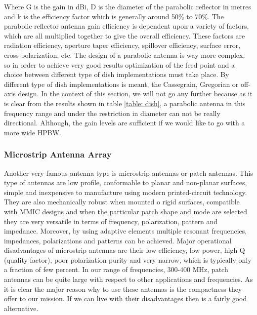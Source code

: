 \noindent
Where G is the gain in dBi, D is the diameter of the parabolic reflector in metres and k is the efficiency factor which is generally around 50\% to 70\%. The parabolic reflector antenna gain efficiency is dependent upon a variety of factors, which are all multiplied together to give the overall efficiency. These factors are radiation efficiency, aperture taper efficiency, spillover efficiency, surface error, cross polarization, etc. The design of a parabolic antenna is way more complex, so in order to achieve very good results optimization of the feed point and a choice between different type of dish implementations must take place. By different type of dish implementations is meant, the Cassegrain, Gregorian or off-axis design. In the context of this section, we will not go any further because as it is clear from the results shown in table \ref{table: dish}, a parabolic antenna in this frequency range and under the restriction in diameter can not be really directional. Although, the gain levels are sufficient if we would like to go with a more wide HPBW.  



\subsubsection{Microstrip Antenna Array}
\label{microstrip antenna}

Another very famous antenna type is microstrip antennas or patch antennas. This type of antennas are low profile, conformable to planar and non-planar surfaces, simple and inexpensive to manufacture using modern printed-circuit technology. They are also mechanically robust when mounted o rigid surfaces, compatible with MMIC designs and when the particular patch shape and mode are selected they are very versatile in terms of frequency, polarization, pattern and impedance. Moreover, by using adaptive elements multiple resonant frequencies, impedances, polarizations and patterns can be achieved. Major operational disadvantages of microstrip antennas are their low efficiency, low power, high Q (quality factor), poor polarization purity and very narrow, which is typically only a fraction of few percent. In our range of frequencies, 300-400 MHz, patch antennas can be quite large with respect to other applications and frequencies. As it is clear the major reason why to use these antennas is the compactness they offer to our mission. If we can live with their disadvantages then is a fairly good alternative. 


